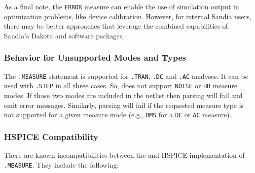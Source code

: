 As a final note, the \texttt{ERROR} measure can enable the use of \Xyce{} simulation 
output in optimization problems, like device calibration.  However, for internal
Sandia users, there may be better approaches that leverage the combined
capabilities of Sandia's Dakota and \Xyce{} software packages.

\subsubsection{Behavior for Unsupported Modes and Types}
\label{Measure_Unsupported_Types}
The \texttt{.MEASURE} statement is supported for \texttt{.TRAN}, \texttt{.DC} and 
\texttt{.AC} analyses. It can be used with {\tt .STEP} in all three cases.  So, \Xyce{} does not 
support \texttt{NOISE} or \texttt{HB} measure modes.  If those two modes are included in the netlist
then \Xyce{} parsing will fail and emit error messages.  Similarly, \Xyce{} parsing will fail if the 
requested measure type is not supported for a given measure mode (e.g., \texttt{RMS} for a 
\texttt{DC} or \texttt{AC} measure). 

\subsubsection{HSPICE Compatibility}
\label{Measure_HSpice_Compatibility}
There are known incompatibilities between the \Xyce{} and HSPICE implementation
of {\tt .MEASURE}.  They include the following:

